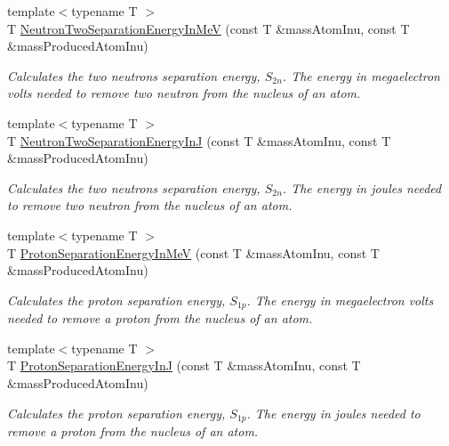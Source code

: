 \begin{DoxyCompactItemize}
{\footnotesize template$<$typename T $>$ }\\T \mbox{\hyperlink{group___e_g_x_phys-_nuclear_separation_energy_ga09985fc876eb632695bfbc1f2f325401}{Neutron\+Two\+Separation\+Energy\+In\+MeV}} (const T \&mass\+Atom\+Inu, const T \&mass\+Produced\+Atom\+Inu)
\begin{DoxyCompactList}\small\item\em Calculates the two neutrons separation energy, $S_{2n}$. The energy in megaelectron volts needed to remove two neutron from the nucleus of an atom. \end{DoxyCompactList}\item 
{\footnotesize template$<$typename T $>$ }\\T \mbox{\hyperlink{group___e_g_x_phys-_nuclear_separation_energy_ga293ac9428420a0adf4235048dbe529b4}{Neutron\+Two\+Separation\+Energy\+InJ}} (const T \&mass\+Atom\+Inu, const T \&mass\+Produced\+Atom\+Inu)
\begin{DoxyCompactList}\small\item\em Calculates the two neutrons separation energy, $S_{2n}$. The energy in joules needed to remove two neutron from the nucleus of an atom. \end{DoxyCompactList}\item 
{\footnotesize template$<$typename T $>$ }\\T \mbox{\hyperlink{group___e_g_x_phys-_nuclear_separation_energy_ga6a619ded55c47ed22ea2d8a85202ebeb}{Proton\+Separation\+Energy\+In\+MeV}} (const T \&mass\+Atom\+Inu, const T \&mass\+Produced\+Atom\+Inu)
\begin{DoxyCompactList}\small\item\em Calculates the proton separation energy, $S_{1p}$. The energy in megaelectron volts needed to remove a proton from the nucleus of an atom. \end{DoxyCompactList}\item 
{\footnotesize template$<$typename T $>$ }\\T \mbox{\hyperlink{group___e_g_x_phys-_nuclear_separation_energy_ga4274d8f5a3860169fd81970707eb582a}{Proton\+Separation\+Energy\+InJ}} (const T \&mass\+Atom\+Inu, const T \&mass\+Produced\+Atom\+Inu)
\begin{DoxyCompactList}\small\item\em Calculates the proton separation energy, $S_{1p}$. The energy in joules needed to remove a proton from the nucleus of an atom. \end{DoxyCompactList}\item 

\end{DoxyCompactItemize}
